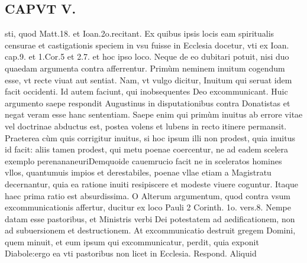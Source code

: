 \documentclass{article}
\begin{document}
\begin{pages}
\section*{CAPVT  V. }
\marginpar{[ p.389 ]}\pstart sti, quod Matt.18. et Ioan.2o.recitant. Ex quibus ipsis locis eam spiritualis censurae et castigationis speciem in vsu fuisse in Ecclesia docetur, vti ex Ioan. cap.9. et 1.Cor.5 et 2.7. et hoc ipso loco. Neque de eo dubitari potuit, nisi duo quaedam argumenta contra afferrentur. Primùm neminem inuitum cogendum esse, vt recte viuat aut sentiat. Nam, vt vulgo dicitur, Inuitum qui seruat idem facit occidenti. Id autem faciunt, qui inobsequentes Deo excommunicant. Huic argumento saepe respondit Augustinus in disputationibus contra Donatistas et negat veram esse hanc sententiam. Saepe enim qui primùm inuitus ab errore vitae vel doctrinae abductus est, postea volens et lubens in recto itinere permansit. Praeterea cùm quis corrigitur inuitus, si hoc ipsum illi non prodest, quia inuitus id facit: aliis tamen prodest, qui metu poenae coercentur, ne ad eadem scelera exemplo perenananeuriDemquoide cauemrucio facit ne in sceleratos homines vllos, quantumuis impios et derestabiles, poenae vllae etiam a Magistratu decernantur, quia ea ratione inuiti resipiscere et modeste viuere coguntur. Itaque haec prima ratio est absurdissima. O  \pend\pstart Alterum argumentum, quod contra vsum excommunicationis affertur, ducitur ex loco Pauli 2 Corinth. 1o. vers.8. Nempe datam esse pastoribus, et Ministris verbi Dei potestatem ad aedificationem, non ad subuersionem et destructionem. At excommunicatio destruit gregem Domini, quem minuit, et eum ipsum qui excommunicatur, perdit, quia exponit Diabole:ergo ea vti pastoribus non licet in Ecclesia. Respond. Aliquid  \pend

\end{pages}
\end{document}
